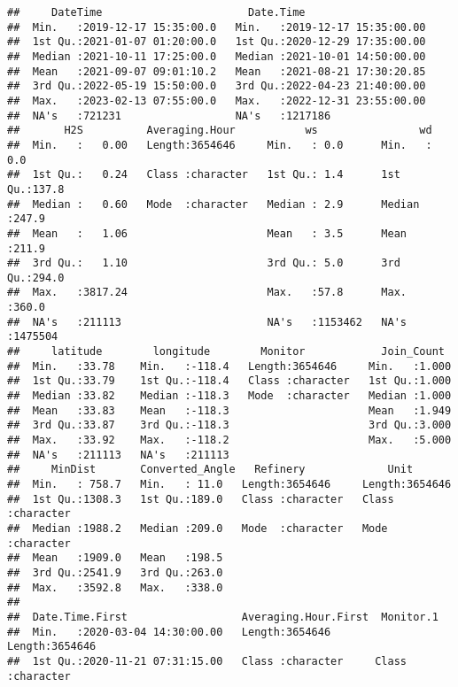 \documentclass[
]{article}
\begin{document}
\begin{verbatim}
##     DateTime                       Date.Time                     
##  Min.   :2019-12-17 15:35:00.0   Min.   :2019-12-17 15:35:00.00  
##  1st Qu.:2021-01-07 01:20:00.0   1st Qu.:2020-12-29 17:35:00.00  
##  Median :2021-10-11 17:25:00.0   Median :2021-10-01 14:50:00.00  
##  Mean   :2021-09-07 09:01:10.2   Mean   :2021-08-21 17:30:20.85  
##  3rd Qu.:2022-05-19 15:50:00.0   3rd Qu.:2022-04-23 21:40:00.00  
##  Max.   :2023-02-13 07:55:00.0   Max.   :2022-12-31 23:55:00.00  
##  NA's   :721231                  NA's   :1217186                 
##       H2S          Averaging.Hour           ws                wd         
##  Min.   :   0.00   Length:3654646     Min.   : 0.0      Min.   :  0.0    
##  1st Qu.:   0.24   Class :character   1st Qu.: 1.4      1st Qu.:137.8    
##  Median :   0.60   Mode  :character   Median : 2.9      Median :247.9    
##  Mean   :   1.06                      Mean   : 3.5      Mean   :211.9    
##  3rd Qu.:   1.10                      3rd Qu.: 5.0      3rd Qu.:294.0    
##  Max.   :3817.24                      Max.   :57.8      Max.   :360.0    
##  NA's   :211113                       NA's   :1153462   NA's   :1475504  
##     latitude        longitude        Monitor            Join_Count   
##  Min.   :33.78    Min.   :-118.4   Length:3654646     Min.   :1.000  
##  1st Qu.:33.79    1st Qu.:-118.4   Class :character   1st Qu.:1.000  
##  Median :33.82    Median :-118.3   Mode  :character   Median :1.000  
##  Mean   :33.83    Mean   :-118.3                      Mean   :1.949  
##  3rd Qu.:33.87    3rd Qu.:-118.3                      3rd Qu.:3.000  
##  Max.   :33.92    Max.   :-118.2                      Max.   :5.000  
##  NA's   :211113   NA's   :211113                                     
##     MinDist       Converted_Angle   Refinery             Unit          
##  Min.   : 758.7   Min.   : 11.0   Length:3654646     Length:3654646    
##  1st Qu.:1308.3   1st Qu.:189.0   Class :character   Class :character  
##  Median :1988.2   Median :209.0   Mode  :character   Mode  :character  
##  Mean   :1909.0   Mean   :198.5                                        
##  3rd Qu.:2541.9   3rd Qu.:263.0                                        
##  Max.   :3592.8   Max.   :338.0                                        
##                                                                        
##  Date.Time.First                  Averaging.Hour.First  Monitor.1        
##  Min.   :2020-03-04 14:30:00.00   Length:3654646       Length:3654646    
##  1st Qu.:2020-11-21 07:31:15.00   Class :character     Class :character  

\end{verbatim}
\end{document}
